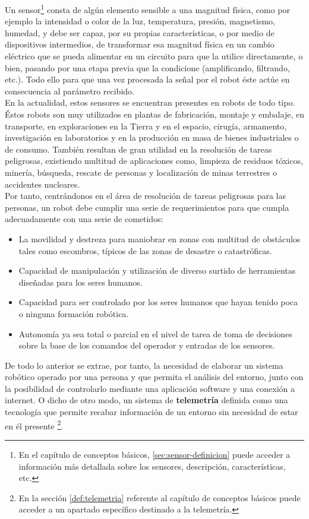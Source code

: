 Un sensor\footnote{En el capítulo de conceptos básicos, \ref{sec:sensor-definicion} puede acceder a información más detallada sobre los sensores, descripción, características, etc.}
consta de algún elemento sensible a una magnitud física, como por ejemplo la intensidad o color de la luz, temperatura, presión, magnetismo, humedad, y debe ser capaz,
por su propias características, o por medio de dispositivos intermedios, de transformar esa magnitud física en un cambio eléctrico que se pueda alimentar en un circuito para
que la utilice directamente, o bien, pasando por una etapa previa que la condicione (amplificando, filtrando, etc.). Todo ello para que una vez procesada la señal por el robot
 éste actúe en consecuencia al parámetro recibido.\\

En la actualidad, estos sensores se encuentran presentes en robots de todo tipo. Éstos robots son muy utilizados en plantas de fabricación, montaje y embalaje, en transporte, en exploraciones en la Tierra y en el espacio, cirugía, armamento, investigación en laboratorios y 
en la producción en masa de bienes industriales o de consumo. También resultan de gran utilidad en la resolución de tareas peligrosas, existiendo multitud de aplicaciones como, 
limpieza de residuos tóxicos, minería, búsqueda, rescate de personas y localización de minas terrestres o accidentes nucleares.\\

Por tanto, centrándonos en el área de resolución de tareas peligrosas para las personas, un robot debe cumplir una serie de requerimientos para que cumpla adecuadamente con una serie 
de cometidos:

\begin{itemize}
 \item La movilidad y destreza para maniobrar en zonas con multitud de obstáculos tales como escombros, típicos de las zonas de desastre o catastróficas.
 \item Capacidad de manipulación y utilización de diverso surtido de herramientas diseñadas para los seres humanos.
 \item Capacidad para ser controlado por los seres humanos que hayan tenido poca o ninguna formación robótica.
 \item Autonomía ya sea total o parcial en el nivel de tarea de toma de decisiones sobre la base de los comandos del operador y entradas de los sensores.
\end{itemize}

De todo lo anterior se extrae, por tanto, la necesidad de elaborar un sistema robótico operado por una persona y que permita el análisis del entorno, junto con la posibilidad de controlarlo mediante una 
aplicación software y una conexión a internet. O dicho de otro modo, un sistema de \textbf{telemetría} definida como una tecnología que permite recabar información de un entorno
sin necesidad de estar en él presente \footnote{En la sección \ref{def:telemetria} referente al capítulo de conceptos básicos puede acceder a un apartado específico destinado a la telemetría.}.\\

